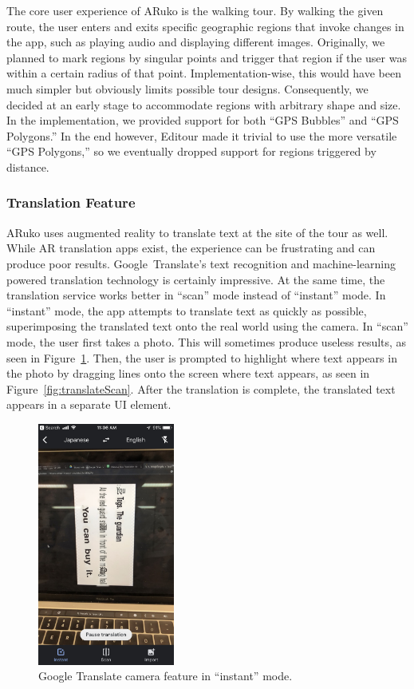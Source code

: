 \documentclass[a4paper, 10pt, american, titlepage]{article}
\begin{document}
The core user experience of ARuko is the walking tour. By walking the given
route, the user enters and exits specific geographic regions that invoke changes
in the app, such as playing audio and displaying different images. Originally,
we planned to mark regions by singular points and trigger that region if the
user was within a certain radius of that point. Implementation-wise, this would
have been much simpler but obviously limits possible tour designs.
Consequently, we decided at an early stage to accommodate regions with arbitrary
shape and size.  In the implementation, we provided support for both ``GPS
Bubbles'' and ``GPS Polygons.'' In the end however, Editour made it trivial to
use the more versatile ``GPS Polygons,'' so we eventually dropped support for
regions triggered by distance.

\subsubsection{Translation Feature}
\label{sec:translationFeature}

ARuko uses augmented reality to translate text at the site of the tour as well.
While AR translation apps exist, the experience can be frustrating and can
produce poor results. Google~Translate's text recognition and machine-learning
powered translation technology is certainly impressive. At the same time, the
translation service works better in ``scan'' mode instead of ``instant'' mode.
In ``instant'' mode, the app attempts to translate text as quickly as possible,
superimposing the translated text onto the real world using the camera. In
``scan'' mode, the user first takes a photo. This will sometimes produce useless
results, as seen in Figure~\ref{fig:translateInstant}. Then, the user is
prompted to highlight where text appears in the photo by dragging lines onto the
screen where text appears, as seen in Figure~\ref{fig:translateScan}. After the
translation is complete, the translated text appears in a separate UI element.

\begin{figure}[h]
	\centering
	\includegraphics[width=0.4\textwidth]{translate-instant.jpg}
	\caption{Google Translate camera feature in ``instant'' mode.}
	\label{fig:translateInstant}
\end{figure}
\end{document}
